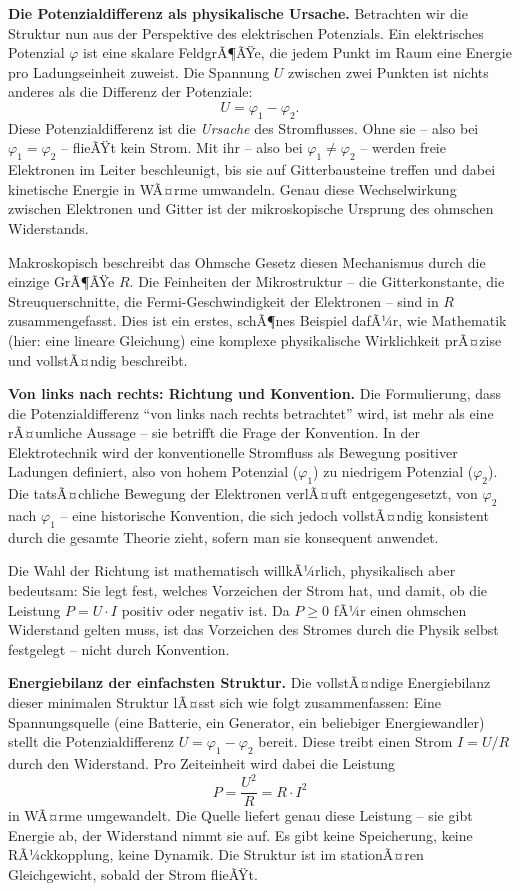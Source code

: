 ﻿\documentclass[12pt, a4paper]{article}
\begin{document}
	\textbf{Die Potenzialdifferenz als physikalische Ursache.}
	Betrachten wir die Struktur nun aus der Perspektive des elektrischen Potenzials. Ein elektrisches Potenzial $\varphi$ ist eine skalare FeldgrÃ¶ÃŸe, die jedem Punkt im Raum eine Energie pro Ladungseinheit zuweist. Die Spannung $U$ zwischen zwei Punkten ist nichts anderes als die Differenz der Potenziale:
	\begin{equation}
		U = \varphi_1 - \varphi_2.
		\label{eq:potential_diff}
	\end{equation}
	Diese Potenzialdifferenz ist die \textit{Ursache} des Stromflusses. Ohne sie -- also bei $\varphi_1 = \varphi_2$ -- flieÃŸt kein Strom. Mit ihr -- also bei $\varphi_1 \neq \varphi_2$ -- werden freie Elektronen im Leiter beschleunigt, bis sie auf Gitterbausteine treffen und dabei kinetische Energie in WÃ¤rme umwandeln. Genau diese Wechselwirkung zwischen Elektronen und Gitter ist der mikroskopische Ursprung des ohmschen Widerstands.

	Makroskopisch beschreibt das Ohmsche Gesetz diesen Mechanismus durch die einzige GrÃ¶ÃŸe $R$. Die Feinheiten der Mikrostruktur -- die Gitterkonstante, die Streuquerschnitte, die Fermi-Geschwindigkeit der Elektronen -- sind in $R$ zusammengefasst. Dies ist ein erstes, schÃ¶nes Beispiel dafÃ¼r, wie Mathematik (hier: eine lineare Gleichung) eine komplexe physikalische Wirklichkeit prÃ¤zise und vollstÃ¤ndig beschreibt.

	\textbf{Von links nach rechts: Richtung und Konvention.}
	Die Formulierung, dass die Potenzialdifferenz ``von links nach rechts betrachtet'' wird, ist mehr als eine rÃ¤umliche Aussage -- sie betrifft die Frage der Konvention. In der Elektrotechnik wird der konventionelle Stromfluss als Bewegung positiver Ladungen definiert, also von hohem Potenzial ($\varphi_1$) zu niedrigem Potenzial ($\varphi_2$). Die tatsÃ¤chliche Bewegung der Elektronen verlÃ¤uft entgegengesetzt, von $\varphi_2$ nach $\varphi_1$ -- eine historische Konvention, die sich jedoch vollstÃ¤ndig konsistent durch die gesamte Theorie zieht, sofern man sie konsequent anwendet.

	Die Wahl der Richtung ist mathematisch willkÃ¼rlich, physikalisch aber bedeutsam: Sie legt fest, welches Vorzeichen der Strom hat, und damit, ob die Leistung $P = U \cdot I$ positiv oder negativ ist. Da $P \geq 0$ fÃ¼r einen ohmschen Widerstand gelten muss, ist das Vorzeichen des Stromes durch die Physik selbst festgelegt -- nicht durch Konvention.

	\textbf{Energiebilanz der einfachsten Struktur.}
	Die vollstÃ¤ndige Energiebilanz dieser minimalen Struktur lÃ¤sst sich wie folgt zusammenfassen: Eine Spannungsquelle (eine Batterie, ein Generator, ein beliebiger Energiewandler) stellt die Potenzialdifferenz $U = \varphi_1 - \varphi_2$ bereit. Diese treibt einen Strom $I = U/R$ durch den Widerstand. Pro Zeiteinheit wird dabei die Leistung
	\begin{equation}
		P = \frac{U^2}{R} = R \cdot I^2
	\end{equation}
	in WÃ¤rme umgewandelt. Die Quelle liefert genau diese Leistung -- sie gibt Energie ab, der Widerstand nimmt sie auf. Es gibt keine Speicherung, keine RÃ¼ckkopplung, keine Dynamik. Die Struktur ist im stationÃ¤ren Gleichgewicht, sobald der Strom flieÃŸt.
\end{document}
